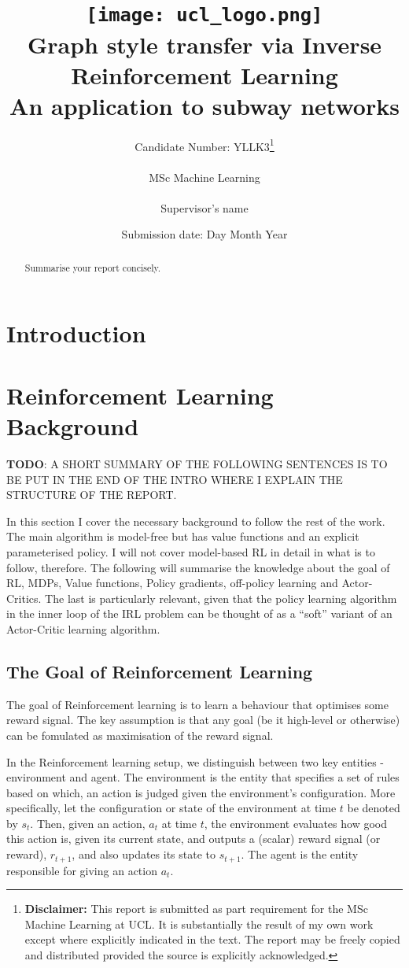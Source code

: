 \documentclass{report}
\title{
  { \texttt{[image: ucl\_logo.png]}}\\
  {{\Huge Graph style transfer via Inverse Reinforcement Learning}}\\
  {\large An application to subway networks}\\
}
\date{Submission date: Day Month Year}
\author{
  Candidate Number: YLLK3\thanks{
      {\bf Disclaimer:}
      This report is submitted as part requirement 
      for the MSc Machine Learning at UCL. It is
      substantially the result of my own work except 
      where explicitly indicated in the text.
      The report may be freely copied and 
      distributed provided the source is explicitly acknowledged.
    }
    \\ \\
  MSc Machine Learning\\ \\
  Supervisor's name
}
\numberwithin{equation}{section}
\numberwithin{figure}{section}
\numberwithin{table}{section}
\begin{document}
\onehalfspacing
\maketitle

\begin{abstract}
  Summarise your report concisely.
\end{abstract}
\tableofcontents
\setcounter{page}{1}

\chapter{Introduction}

\chapter{Reinforcement Learning Background}
\label{chap:RL}
\textbf{TODO}: A SHORT SUMMARY OF THE FOLLOWING SENTENCES IS TO BE PUT 
IN THE END OF THE INTRO WHERE I EXPLAIN THE STRUCTURE OF THE 
REPORT.

In this section I cover the necessary background to follow the 
rest of the work. The main algorithm is model-free but has value 
functions and an explicit parameterised policy. I will not cover 
model-based RL in detail in what is to follow, therefore. The 
following will summarise the knowledge about the goal of RL, 
MDPs, Value functions, Policy gradients, off-policy learning 
and Actor-Critics. The last is particularly relevant, given 
that the policy learning algorithm in the inner loop of the IRL 
problem can be thought of as a ``soft'' variant of an Actor-Critic 
learning algorithm.

\section{The Goal of Reinforcement Learning}
\label{sec:RLGoal}

The goal of Reinforcement learning is to learn a behaviour that 
optimises some reward signal. The key assumption is that 
any goal (be it high-level or otherwise) can be fomulated as 
maximisation of the reward signal.

In the Reinforcement learning setup, we distinguish between two 
key entities - environment and agent. The environment is the 
entity that specifies a set of rules based on which, an action 
is judged given the environment's configuration. 
More specifically, let the configuration or state of the 
environment at time $t$ be denoted by $s_t$. Then, 
given an action, $a_t$ at time $t$, the environment evaluates 
how good this action is, given its 
current state, and outputs a (scalar) reward signal (or reward), 
$r_{t+1}$, and also updates its state to $s_{t+1}$. The agent 
is the entity responsible for giving an action $a_t$. 
\end{document}

